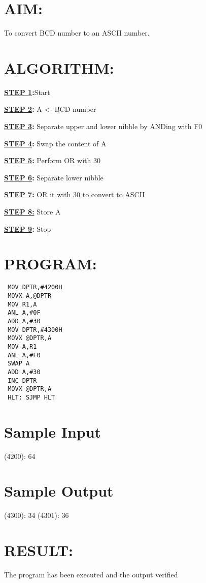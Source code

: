 
%
%
%
%
\section*{AIM:}
To convert BCD number to an ASCII number.

\section*{ALGORITHM:}
\textbf{\underline{STEP 1}:}Start

\textbf{\underline{STEP 2}:} A <- BCD number

\textbf{\underline{STEP 3}:} Separate upper and lower nibble by ANDing with F0

\textbf{\underline{STEP 4}:} Swap the content of A

\textbf{\underline{STEP 5}:} Perform OR with 30 

\textbf{\underline{STEP 6}:} Separate lower nibble

\textbf{\underline{STEP 7}:} OR it with 30 to convert to ASCII

\textbf{\underline{STEP 8:}} Store A

\textbf{\underline{STEP 9}:} Stop


\section*{PROGRAM:}

\begin{lstlisting}
 MOV DPTR,#4200H
 MOVX A,@DPTR
 MOV R1,A 
 ANL A,#0F 
 ADD A,#30
 MOV DPTR,#4300H
 MOVX @DPTR,A 
 MOV A,R1
 ANL A,#F0
 SWAP A
 ADD A,#30
 INC DPTR
 MOVX @DPTR,A
 HLT: SJMP HLT
\end{lstlisting}

\section*{Sample Input}
(4200): 64
\section*{Sample Output}
(4300): 34 
(4301): 36 

\section*{RESULT:}
The program has been executed and the output verified
%
%
%
%
